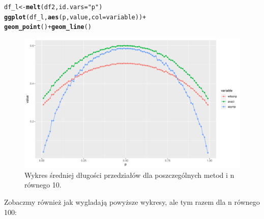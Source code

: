 \documentclass[12pt]{mwart}\usepackage[]{graphicx}\usepackage[]{color}
\makeatletter
\def\maxwidth{ %
  \ifdim\Gin@nat@width>\linewidth
    \linewidth
  \else
    \Gin@nat@width
  \fi
}
\newcommand{\hlstr}[1]{\textcolor[rgb]{0.192,0.494,0.8}{#1}}%
\newcommand{\hlopt}[1]{\textcolor[rgb]{0,0,0}{#1}}%
\newcommand{\hlstd}[1]{\textcolor[rgb]{0.345,0.345,0.345}{#1}}%
\newcommand{\hlkwb}[1]{\textcolor[rgb]{0.69,0.353,0.396}{#1}}%
\newcommand{\hlkwc}[1]{\textcolor[rgb]{0.333,0.667,0.333}{#1}}%
\newcommand{\hlkwd}[1]{\textcolor[rgb]{0.737,0.353,0.396}{\textbf{#1}}}%
\newenvironment{kframe}{%
 \def\at@end@of@kframe{}%
 \ifinner\ifhmode%
  \def\at@end@of@kframe{\end{minipage}}%
  \begin{minipage}{\columnwidth}%
 \fi\fi%
 \def\FrameCommand##1{\hskip\@totalleftmargin \hskip-\fboxsep
 \colorbox{shadecolor}{##1}\hskip-\fboxsep
     \hskip-\linewidth \hskip-\@totalleftmargin \hskip\columnwidth}%
 \MakeFramed {\advance\hsize-\width
   \@totalleftmargin\z@ \linewidth\hsize
   \@setminipage}}%
 {\par\unskip\endMakeFramed%
 \at@end@of@kframe}
\newenvironment{knitrout}{}{} %
\makeatother
\begin{document}
\begin{knitrout}
\color{fgcolor}\begin{kframe}
\begin{alltt}
\hlstd{df_l} \hlkwb{<-} \hlkwd{melt}\hlstd{(df2,}\hlkwc{id.vars}\hlstd{=}\hlstr{"p"}\hlstd{)}
\hlkwd{ggplot}\hlstd{(df_l,}\hlkwd{aes}\hlstd{(p, value,}\hlkwc{col}\hlstd{=variable))}\hlopt{+}
  \hlkwd{geom_point}\hlstd{()}\hlopt{+} \hlkwd{geom_line}\hlstd{()}
\end{alltt}
\end{kframe}\begin{figure}[H]
\includegraphics[width=\maxwidth]{figure/fig_7-1} \caption{\label{fig:7}Wykres średniej długości przedziałów dla poszczególnych metod i n równego 10.}\label{fig:fig_7}
\end{figure}

\end{knitrout}
Zobaczmy również jak wygladają powyższe wykresy, ale tym razem dla n równego 100:
\end{document}
